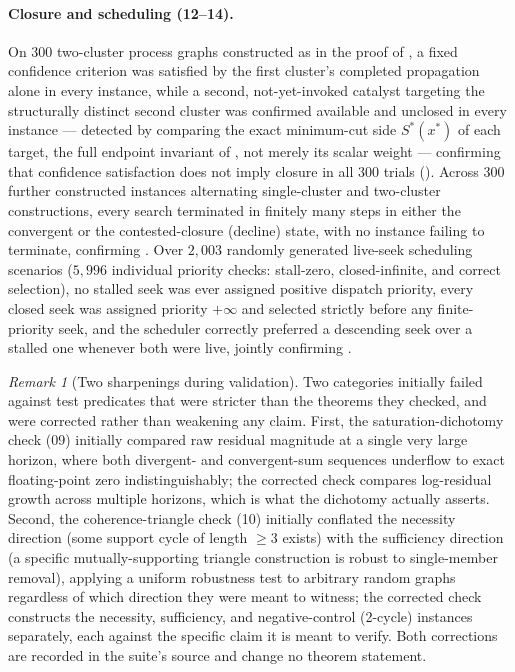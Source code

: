 \documentclass[11pt,twocolumn,a4paper]{article}
\theoremstyle{thmstyle}
\theoremstyle{definition}
\theoremstyle{remark}
\newtheorem{remark}[theorem]{Remark}
\begin{document}
\paragraph{Closure and scheduling (12--14).}
On $300$ two-cluster process graphs constructed as in the proof of
, a fixed confidence criterion was satisfied by
the first cluster's completed propagation alone in every instance, while a
second, not-yet-invoked catalyst targeting the structurally distinct
second cluster was confirmed available and unclosed in every instance ---
detected by comparing the exact minimum-cut side $S^{\ast}(x^{\ast})$ of
each target, the full endpoint invariant of , not
merely its scalar weight --- confirming that confidence satisfaction does
not imply closure in all $300$ trials (). Across
$300$ further constructed instances alternating single-cluster and
two-cluster constructions, every search terminated in finitely many steps
in either the convergent or the contested-closure (decline) state, with no
instance failing to terminate, confirming . Over
$2{,}003$ randomly generated live-seek scheduling scenarios ($5{,}996$
individual priority checks: stall-zero, closed-infinite, and correct
selection), no stalled seek was ever assigned positive dispatch priority,
every closed seek was assigned priority $+\infty$ and selected strictly
before any finite-priority seek, and the scheduler correctly preferred a
descending seek over a stalled one whenever both were live, jointly
confirming .

\begin{remark}[Two sharpenings during validation]
\label{rem:val-sharpenings}
Two categories initially failed against test predicates that were
stricter than the theorems they checked, and were corrected rather than
weakening any claim. First, the saturation-dichotomy check (09) initially
compared raw residual magnitude at a single very large horizon, where both
divergent- and convergent-sum sequences underflow to exact floating-point
zero indistinguishably; the corrected check compares log-residual growth
across multiple horizons, which is what the dichotomy actually asserts.
Second, the coherence-triangle check (10) initially conflated the
necessity direction (some support cycle of length $\ge3$ exists) with the
sufficiency direction (a specific mutually-supporting triangle
construction is robust to single-member removal), applying a uniform
robustness test to arbitrary random graphs regardless of which direction
they were meant to witness; the corrected check constructs the necessity,
sufficiency, and negative-control (2-cycle) instances separately, each
against the specific claim it is meant to verify. Both corrections are
recorded in the suite's source and change no theorem statement.
\end{remark}
\end{document}
